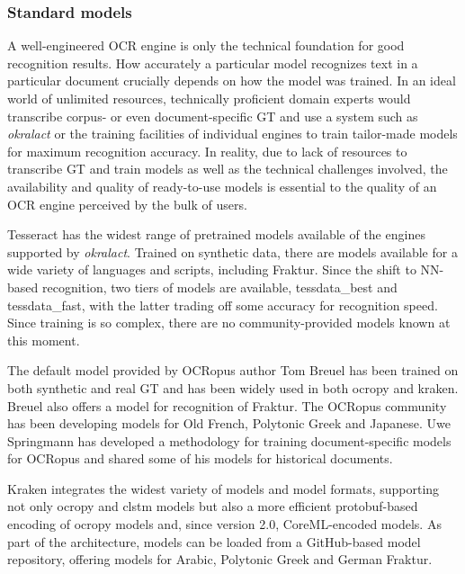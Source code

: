 \documentclass[conference]{IEEEtran}
\begin{document}
\subsubsection{Standard models}

A well-engineered OCR engine is only the technical foundation for
good recognition results. How accurately a particular model recognizes text
in a particular document crucially depends on how the model was trained. In
an ideal world of unlimited resources, technically proficient domain experts
would transcribe corpus- or even document-specific GT and use a system such as
\textit{okralact} or the training facilities of individual engines to train
tailor-made models for maximum recognition accuracy. In reality, due to lack of
resources to transcribe GT and train models as well as the technical
challenges involved, the availability and quality of ready-to-use models is 
essential to the quality of an OCR engine perceived by the bulk of users.

Tesseract has the widest range of pretrained models available of the engines
supported by \textit{okralact}. Trained on synthetic data, there are models available
for a wide variety of languages and scripts, including Fraktur. Since the shift
to NN-based recognition, two tiers of models are available, tessdata\_best and
tessdata\_fast, with the latter trading off some accuracy for recognition speed. 
Since training is so complex, there are no community-provided models known 
at this moment.


The default model provided by OCRopus author Tom Breuel has been trained on
both synthetic and real GT and has been widely used in both ocropy and kraken.
Breuel also offers a model for recognition of Fraktur. The OCRopus community
has been developing models for Old French, Polytonic Greek and Japanese. Uwe
Springmann has developed a methodology for training document-specific models
for OCRopus and shared some of his models for historical documents.

Kraken integrates the widest variety of models and model formats,
supporting not only ocropy and clstm models but also a more efficient
protobuf-based encoding of ocropy models and, since version 2.0, CoreML-encoded
models. As part of the architecture, models can be loaded from a GitHub-based
model repository, offering models for Arabic, Polytonic Greek and German Fraktur.

\end{document}
